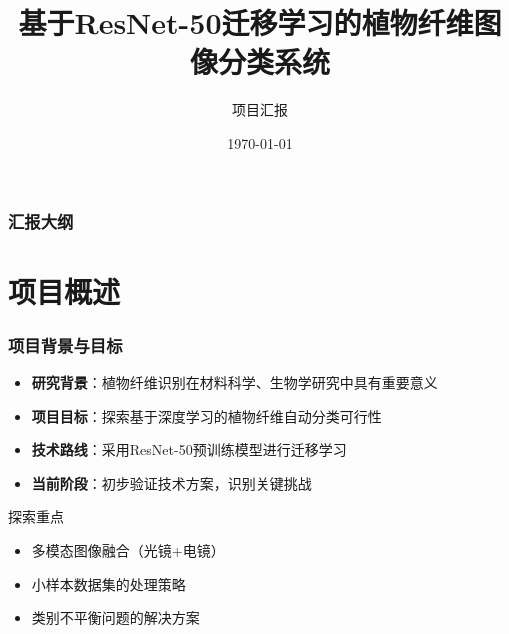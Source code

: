 \documentclass[12pt]{beamer}
\title{基于ResNet-50迁移学习的植物纤维图像分类系统}
\author{项目汇报}
\institute{植物纤维识别项目组}
\date{\today}
\begin{document}
\frame{\titlepage}

\begin{frame}
\frametitle{汇报大纲}
\tableofcontents
\end{frame}

\section{项目概述}

\begin{frame}
\frametitle{项目背景与目标}
\begin{itemize}
    \item \textbf{研究背景}：植物纤维识别在材料科学、生物学研究中具有重要意义
    \item \textbf{项目目标}：探索基于深度学习的植物纤维自动分类可行性
    \item \textbf{技术路线}：采用ResNet-50预训练模型进行迁移学习
    \item \textbf{当前阶段}：初步验证技术方案，识别关键挑战
\end{itemize}

\vspace{0.3cm}
\begin{block}{探索重点}
\begin{itemize}
    \item 多模态图像融合（光镜+电镜）
    \item 小样本数据集的处理策略
    \item 类别不平衡问题的解决方案
\end{itemize}
\end{block}
\end{frame}
\end{document}
